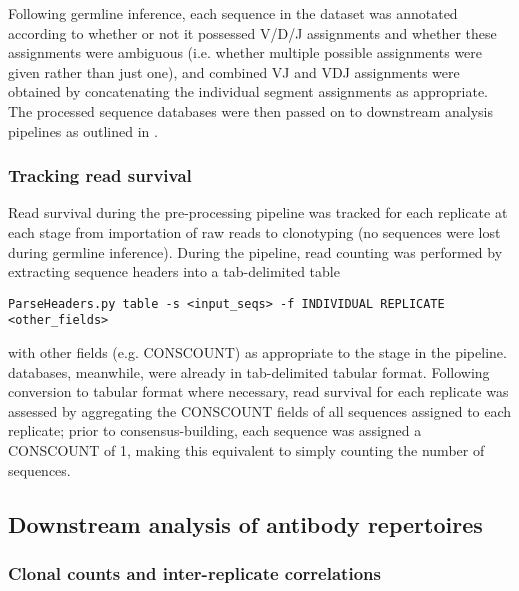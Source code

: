 Following germline inference, each sequence in the dataset was annotated according to whether or not it possessed V/D/J assignments and whether these assignments were ambiguous (i.e. whether multiple possible assignments were given rather than just one), and combined VJ and VDJ assignments were obtained by concatenating the individual segment assignments as appropriate. The processed sequence databases were then passed on to downstream analysis pipelines as outlined in .

\subsubsection{Tracking read survival}
\label{sec:methods_comp_igpreproc_readsurv}

Read survival during the pre-processing pipeline was tracked for each replicate at each stage from importation of raw reads to clonotyping (no sequences were lost during germline inference). During the  pipeline, read counting was performed by extracting sequence headers into a tab-delimited table

\begin{lstlisting}
ParseHeaders.py table -s <input_seqs> -f INDIVIDUAL REPLICATE <other_fields>
\end{lstlisting}  

\noindent with other fields (e.g. CONSCOUNT) as appropriate to the stage in the pipeline.  databases, meanwhile, were already in tab-delimited tabular format. Following conversion to tabular format where necessary, read survival for each replicate was assessed by aggregating the CONSCOUNT fields of all sequences assigned to each replicate; prior to consensus-building, each sequence was assigned a CONSCOUNT of 1, making this equivalent to simply counting the number of sequences.

\subsection{Downstream analysis of antibody repertoires}
\label{sec:methods_comp_igdownstream}

\subsubsection{Clonal counts and inter-replicate correlations}
\label{sec:methods_comp_igdownstream_clones}

